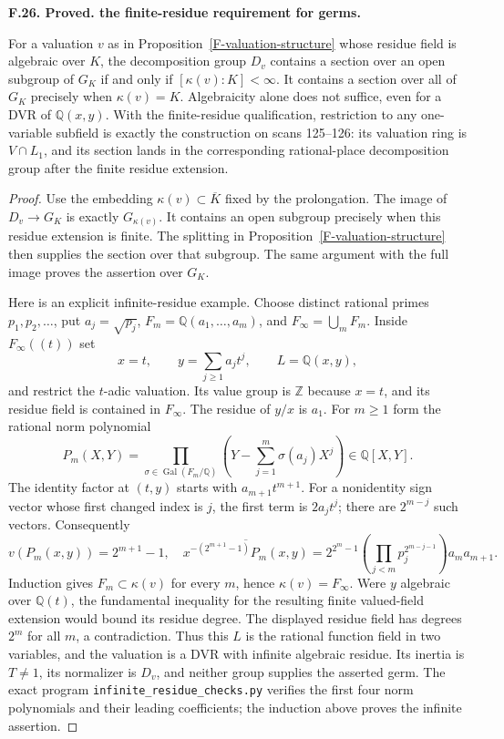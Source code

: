 \documentclass[11pt,oneside]{article}
\makeatletter
\newcounter{statementanchor}
\newenvironment{statement}[3]{%
 \refstepcounter{statementanchor}\def\@currentlabel{#1}%
 \par\addvspace{9pt}\noindent
 \textbf{#1. #2. #3.}\par\nobreak\noindent\ignorespaces
}{\par\addvspace{5pt}}
\makeatother
\begin{document}
\begin{statement}{F.26}{Proved}{the finite-residue requirement for germs}
\label{st:F.26}
\label{F-valuation-germs}
For a valuation $v$ as in Proposition~\ref{F-valuation-structure}
whose residue field is algebraic over $K$, the decomposition group
$D_v$ contains a section over an open subgroup of $G_K$ if and
only if $[\kappa(v):K]<\infty$. It contains a section over all
of $G_K$ precisely when $\kappa(v)=K$. Algebraicity alone
does not suffice, even for a DVR of $\mathbb Q(x,y)$.
With the finite-residue qualification, restriction to any
one-variable subfield is exactly the construction on scans
125--126: its valuation ring is $V\cap L_1$, and its section
lands in the corresponding rational-place decomposition group
after the finite residue extension.
\end{statement}
\begin{proof}
Use the embedding $\kappa(v)\subset\overline K$ fixed by the
prolongation. The image of $D_v\to G_K$ is exactly
$G_{\kappa(v)}$. It contains an open subgroup precisely when
this residue extension is finite. The splitting in
Proposition~\ref{F-valuation-structure} then supplies the section
over that subgroup. The same argument with the full image proves
the assertion over $G_K$.

Here is an explicit infinite-residue example. Choose distinct
rational primes $p_1,p_2,\ldots$, put $a_j=\sqrt{p_j}$,
$F_m=\mathbb Q(a_1,\ldots,a_m)$, and $F_\infty=\bigcup_mF_m$.
Inside $F_\infty((t))$ set
\[
 x=t,\qquad y=\sum_{j\geq1}a_jt^j,
 \qquad L=\mathbb Q(x,y),
\]
and restrict the $t$-adic valuation. Its value group is
$\mathbb Z$ because $x=t$, and its residue field is contained
in $F_\infty$. The residue of $y/x$ is $a_1$. For $m\geq1$
form the rational norm polynomial
\[
 P_m(X,Y)=\prod_{\sigma\in\operatorname{Gal}(F_m/\mathbb Q)}
 \left(Y-\sum_{j=1}^m\sigma(a_j)X^j\right)\in\mathbb Q[X,Y].
\]
The identity factor at $(t,y)$ starts with $a_{m+1}t^{m+1}$.
For a nonidentity sign vector whose first changed index is $j$,
the first term is $2a_jt^j$; there are $2^{m-j}$ such vectors.
Consequently
\[
 v(P_m(x,y))=2^{m+1}-1,
 \quad
 \overline{x^{-(2^{m+1}-1)}P_m(x,y)}
 =2^{2^m-1}\!\left(\prod_{j<m}p_j^{2^{m-j-1}}\right)
   a_m a_{m+1}.
\]
Induction gives $F_m\subset\kappa(v)$ for every $m$, hence
$\kappa(v)=F_\infty$. Were $y$ algebraic over $\mathbb Q(t)$,
the fundamental inequality for the resulting finite valued-field
extension would bound its residue degree. The displayed residue
field has degrees $2^m$ for all $m$, a contradiction. Thus this
$L$ is the rational function field in two variables, and the
valuation is a DVR with infinite algebraic residue. Its inertia
is $T\ne1$, its normalizer is $D_v$, and neither group supplies
the asserted germ. The exact program
\texttt{infinite\_residue\_checks.py} verifies the first four
norm polynomials and their leading coefficients; the induction
above proves the infinite assertion.


\end{proof}
\end{document}
